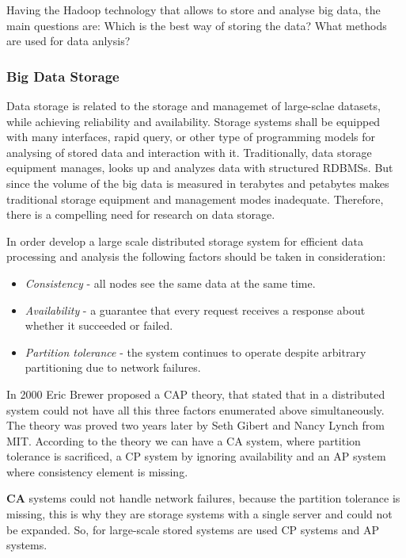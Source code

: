 Having the Hadoop technology that allows to store and analyse big data, the main questions are: Which is the best way of storing the data? What methods are used for data anlysis? 

\subsubsection{Big Data Storage}

Data storage is related to the storage and managemet of large-sclae datasets, while achieving reliability and availability. Storage systems shall be equipped with many interfaces, rapid query, or other type of programming models for analysing of stored data and interaction with it. Traditionally, data storage equipment manages, looks up and analyzes data with structured RDBMSs. But since the volume of the big data is measured in terabytes and petabytes makes traditional storage equipment and management modes inadequate. Therefore, there is a compelling need for research on data storage.\cite{bdtech}

In order develop a large scale distributed storage system for  efficient data processing and analysis the following factors should be taken in consideration:\cite{CAP}

\begin{itemize}

\item \textit{Consistency} - all nodes see the same data at the same time.
\item \textit{Availability} - a guarantee that every request receives a response about whether it succeeded or failed.
\item \textit{Partition tolerance} - the system continues to operate despite arbitrary partitioning due to network failures.

\end{itemize}

In 2000 Eric Brewer proposed a CAP theory, that stated that in a distributed system could not have all this three factors enumerated above simultaneously. The theory was proved two years later by Seth Gibert and Nancy Lynch from MIT. According to the theory we can have a CA system, where partition tolerance is sacrificed, a CP system by ignoring availability and an AP system where consistency element is missing.

\textbf{CA} systems could not handle network failures, because the partition tolerance is missing, this is why they are storage systems with a single server and could not be expanded. So, for large-scale stored systems are used CP systems and AP systems. 

